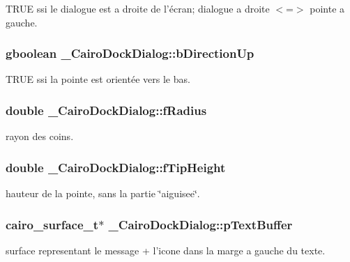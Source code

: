 TRUE ssi le dialogue est a droite de l'écran; dialogue a droite $<$=$>$ pointe a gauche. 

\subsubsection{\setlength{\rightskip}{0pt plus 5cm}gboolean {\bf \_\-CairoDockDialog::bDirectionUp}}\label{struct__CairoDockDialog_0ed99034759804c53dc758f3d1de1791}


TRUE ssi la pointe est orientée vers le bas. 

\subsubsection{\setlength{\rightskip}{0pt plus 5cm}double {\bf \_\-CairoDockDialog::fRadius}}\label{struct__CairoDockDialog_4b66164db266683fbca41b8372b85d50}


rayon des coins. 

\subsubsection{\setlength{\rightskip}{0pt plus 5cm}double {\bf \_\-CairoDockDialog::fTipHeight}}\label{struct__CairoDockDialog_210d41b9cbdea2dac8cba77ba33d2ef0}


hauteur de la pointe, sans la partie \char`\"{}aiguisee\char`\"{}. 

\subsubsection{\setlength{\rightskip}{0pt plus 5cm}cairo\_\-surface\_\-t$\ast$ {\bf \_\-CairoDockDialog::pTextBuffer}}\label{struct__CairoDockDialog_dfa4889a4aa5f0e53eecd51ea58cd4b1}


surface representant le message + l'icone dans la marge a gauche du texte. 

